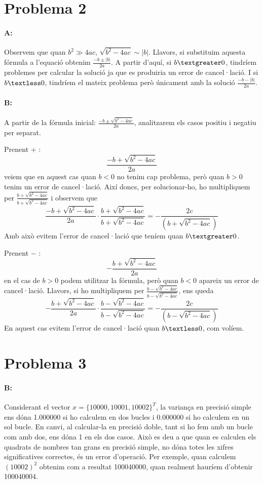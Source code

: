 \documentclass{article}
\begin{document}
	\newpage
	
	\section{Problema 2}
	\paragraph{A:} Observem que quan $b^2 \gg 4ac$, $\sqrt{b^2-4ac}\sim|b|$. Llavors, si substituim aquesta fórmula a l'equació obtenim $\frac{-b\pm|b|}{2a}$. A partir d'aquí, si $b\textgreater0$, tindríem problemes per calcular la solució ja que es produiria un error de cancel·lació. I si $b\textless0$, tindríem el mateix problema però únicament amb la solució $\frac{-b-|b|}{2a}$.
	
	\paragraph{B:} A partir de la fórmula inicial: $\frac{-b\pm\sqrt{b^2-4ac}}{2a}$, analitzarem els casos positiu i negatiu per separat.
	
	Prenent + : $$\frac{-b+\sqrt{b^2-4ac}}{2a}$$ 
	veiem que en aquest cas quan $b<0$ no tenim cap problema, però quan $b>0$ tenim un error de cancel·lació. Així doncs, per solucionar-ho, ho multipliquem per $\frac{b+\sqrt{b^2-4ac}}{b+\sqrt{b^2-4ac}}$ i observem que 
	$$\frac{-b+\sqrt{b^2-4ac}}{2a}\cdot\frac{b+\sqrt{b^2-4ac}}{b+\sqrt{b^2-4ac}}=-\frac{2c}{(b+\sqrt{b^2-4ac})}$$
	Amb això evitem l'error de cancel·lació que teníem quan $b\textgreater0$.
	
	Prenent $-$ : $$-\frac{b+\sqrt{b^2-4ac}}{2a}$$
	en el cas de $b>0$ podem utilitzar la fórmula, però quan $b<0$ apareix un error de cancel·lació. Llavors, si ho multipliquem per $\frac{b-\sqrt{b^2-4ac}}{b-\sqrt{b^2-4ac}}$, ens queda 
	$$-\frac{b+\sqrt{b^2-4ac}}{2a}\cdot\frac{b-\sqrt{b^2-4ac}}{b-\sqrt{b^2-4ac}}=-\frac{2c}{(b-\sqrt{b^2-4ac})}$$
	En aquest cas evitem l'error de cancel·lació quan $b\textless0$, com volíem.
	
	\newpage
	
	\section{Problema 3}
	\paragraph{B:} Considerant el vector $x={\{10000,10001,10002\}}^T$, la variança en precisió simple ens dóna 1.000000 si ho calculem en dos bucles i 0.000000 si ho calculem en un sol bucle. En canvi, al calcular-la en precisió doble, tant si ho fem amb un bucle com amb dos, ens dóna 1 en els dos casos. Això es deu a que quan es calculen els quadrats de nombres tan grans en precisió simple, no dóna totes les xifres significatives correctes, és un error d'operació.
	Per exemple, quan calculem $(10002)^2$ obtenim com a resultat 100040000, quan realment hauríem d'obtenir 100040004.
	
\end{document}
